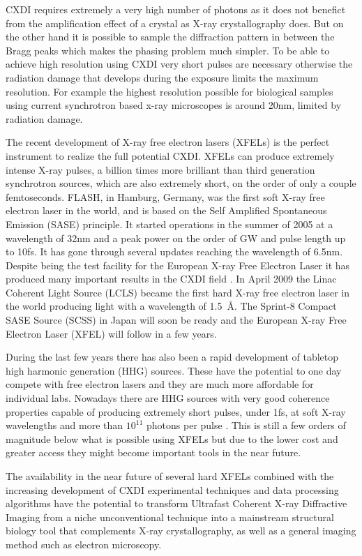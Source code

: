 CXDI requires extremely a very high number of photons as it does not benefict from the
amplification effect of a crystal as X-ray crystallography does. But on the
other hand it is possible to sample the diffraction pattern in between the Bragg
peaks which makes the phasing problem much simpler. To be able to achieve high
resolution using CXDI very short pulses are necessary otherwise the radiation
damage that develops during the exposure limits the maximum resolution. For
example the highest resolution possible for biological samples using current
synchrotron based x-ray microscopes is around 20nm, limited by radiation damage.

The recent development of X-ray free electron lasers (XFELs) is the perfect
instrument to realize the full potential CXDI. XFELs can produce extremely
intense X-ray pulses, a billion times more brilliant than third
generation synchrotron sources, which are also extremely short, on the order of
only a couple femtoseconds. FLASH, in Hamburg, Germany, was the first soft X-ray
free electron laser in the world, and is based on the Self Amplified Spontaneous
Emission (SASE) principle. It started operations in the summer of 2005 at
a wavelength of 32nm and a peak power on the order of GW and pulse length up to
10fs. It has gone through several updates reaching the wavelength of
6.5nm. Despite being the test facility for the European X-ray Free Electron
Laser it has produced many important results in the CXDI field \cite{Cowboys, Chapman Holography}. In April 2009 the Linac Coherent Light Source (LCLS)
became the first hard X-ray free electron laser in the world producing light
with a wavelength of \mbox{1.5 \AA}. The Sprint-8 Compact SASE Source (SCSS) in
Japan will soon be ready and the European X-ray Free Electron Laser (XFEL)
will follow in a few years.

During the last few years there has also been a rapid development of tabletop
high harmonic generation (HHG) sources. These have the potential to one day
compete with free electron lasers and they are much more affordable for
individual labs. Nowadays there are HHG sources with very good coherence
properties capable of producing extremely short pulses, under 1fs, at soft X-ray wavelengths and more than $10^{11}$ photons
per pulse \cite{Ravasio}. This is still a few orders of magnitude below what is
possible using XFELs but due to the lower cost and greater access they might
become important tools in the near future.

The availability in the near future of several hard XFELs combined with the
increasing development of CXDI experimental techniques and data processing
algorithms have the potential to transform Ultrafast Coherent X-ray Diffractive
Imaging from a niche unconventional technique into a mainstream structural
biology tool that complements X-ray crystallography, as well as a general
imaging method such as electron microscopy.


